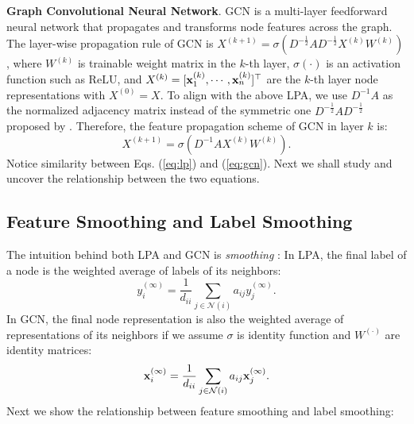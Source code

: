 \documentclass{article}
\begin{document}
		\textbf{Graph Convolutional Neural Network}.
		GCN is a multi-layer feedforward neural network that propagates and transforms node features across the graph.
		The layer-wise propagation rule of GCN is $X^{(k+1)} = \sigma (D^{-\frac{1}{2}} A D^{-\frac{1}{2}} X^{(k)} W^{(k)})$, where $W^{(k)}$ is trainable weight matrix in the $k$-th layer, $\sigma(\cdot)$ is an activation function such as $\text{ReLU}$, and $X^{(k)} = [{\bf x}_1^{(k)},\cdots, {\bf x}_n^{(k)}]^\top$ are the $k$-th layer node representations with $X^{(0)} = X$.
		To align with the above LPA, we use $D^{-1}A$ as the normalized adjacency matrix instead of the symmetric one $D^{-\frac{1}{2}} A D^{-\frac{1}{2}}$ proposed by \cite{kipf2017semi}.
		Therefore, the feature propagation scheme of GCN in layer $k$ is:
		\begin{equation}
		\label{eq:gcn}
			X^{(k+1)} = \sigma \left( D^{-1} A X^{(k)} W^{(k)} \right).
		\end{equation}
Notice similarity between Eqs. (\ref{eq:lp}) and (\ref{eq:gcn}). Next we shall study and uncover the relationship between the two equations.
		
		
	\subsection{Feature Smoothing and Label Smoothing}
		The intuition behind both LPA and GCN is \textit{smoothing} \citep{zhu2003semi,li2018deeper}:
		In LPA, the final label of a node is the weighted average of labels of its neighbors:
		\begin{equation}
			y_i^{(\infty)} = \frac{1}{d_{ii}} \sum_{j \in \mathcal N(i)} a_{ij} y_j^{(\infty)}.
		\end{equation}
		In GCN, the final node representation is also the weighted average of representations of its neighbors if we assume $\sigma$ is identity function and $W^{(\cdot)}$ are identity matrices:
		\begin{equation}
			{\bf x}_i^{(\infty)} = \frac{1}{d_{ii}} \sum_{j \in \mathcal N(i)} a_{ij} {\bf x}_j^{(\infty)}.
		\end{equation}
Next we show the relationship between feature smoothing and label smoothing:
		
\end{document}
